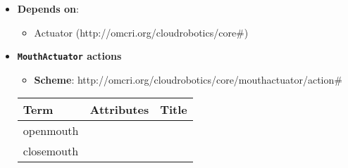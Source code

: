 \begin{itemize}
\item \textbf{Depends on}:
\begin{itemize}
	\item Actuator (http://omcri.org/cloudrobotics/core\#)
\end{itemize}
\end{itemize}


\begin{itemize}
\item \textbf{\texttt{MouthActuator} actions}

\begin{itemize}
	\item \textbf{Scheme}: http://omcri.org/cloudrobotics/core/mouthactuator/action\#
\end{itemize}

\begin{center}
\begin{tabular}{|l|l|l|}
  \hline
  \textbf{Term}  & \textbf{Attributes} & \textbf{Title} \\
  \hline  
  openmouth & &  \\
  \hline
  closemouth & &  \\
  \hline
\end{tabular}
\end{center}
\end{itemize}

 
